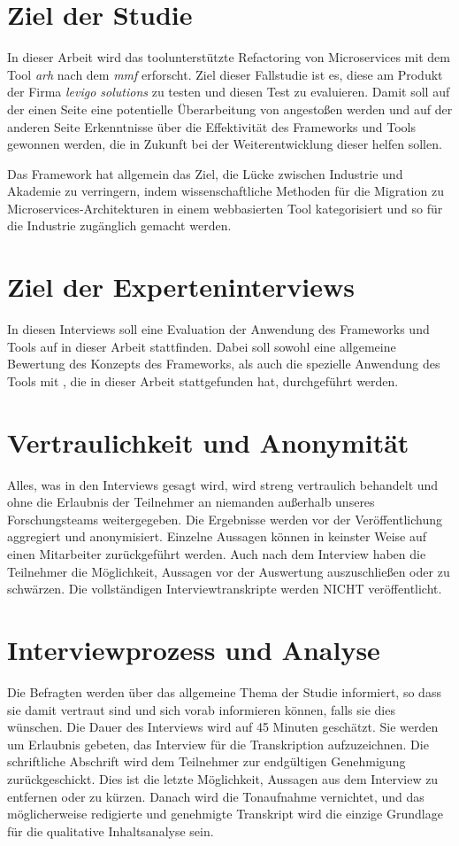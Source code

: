 \section{Ziel der Studie}

In dieser Arbeit wird das toolunterstützte Refactoring von Microservices mit dem Tool \emph{\acrlong{arh}} nach dem \emph{\acrlong{mmf}} erforscht.
Ziel dieser Fallstudie ist es, diese am Produkt \jf der Firma \emph{levigo solutions} zu testen und diesen Test zu evaluieren.
Damit soll auf der einen Seite eine potentielle Überarbeitung von \jf angestoßen werden und auf der anderen Seite Erkenntnisse über die Effektivität des Frameworks und Tools gewonnen werden, die in Zukunft bei der Weiterentwicklung dieser helfen sollen.

Das Framework hat allgemein das Ziel, die Lücke zwischen Industrie und Akademie zu verringern, indem wissenschaftliche Methoden für die Migration zu Microservices-Architekturen in einem webbasierten Tool kategorisiert und so für die Industrie zugänglich gemacht werden.

\section{Ziel der Experteninterviews}

In diesen Interviews soll eine Evaluation der Anwendung des Frameworks und Tools auf \jf in dieser Arbeit stattfinden.
Dabei soll sowohl eine allgemeine Bewertung des Konzepts des Frameworks, als auch die spezielle Anwendung des Tools mit \jf, die in dieser Arbeit stattgefunden hat, durchgeführt werden.

\section{Vertraulichkeit und Anonymität}
Alles, was in den Interviews gesagt wird, wird streng vertraulich behandelt und ohne die Erlaubnis der Teilnehmer an niemanden außerhalb unseres Forschungsteams weitergegeben.
Die Ergebnisse werden vor der Veröffentlichung aggregiert und anonymisiert.
Einzelne Aussagen können in keinster Weise auf einen Mitarbeiter zurückgeführt werden.
Auch nach dem Interview haben die Teilnehmer die Möglichkeit, Aussagen vor der Auswertung auszuschließen oder zu schwärzen.
Die vollständigen Interviewtranskripte werden NICHT veröffentlicht.

\section{Interviewprozess und Analyse}
Die Befragten werden über das allgemeine Thema der Studie informiert, so dass sie damit vertraut sind und sich vorab informieren können, falls sie dies wünschen.
Die Dauer des Interviews wird auf 45 Minuten geschätzt.
Sie werden um Erlaubnis gebeten, das Interview für die Transkription aufzuzeichnen.
Die schriftliche Abschrift wird dem Teilnehmer zur endgültigen Genehmigung zurückgeschickt.
Dies ist die letzte Möglichkeit, Aussagen aus dem Interview zu entfernen oder zu kürzen.
Danach wird die Tonaufnahme vernichtet, und das möglicherweise redigierte und genehmigte Transkript wird die einzige Grundlage für die qualitative Inhaltsanalyse sein.

